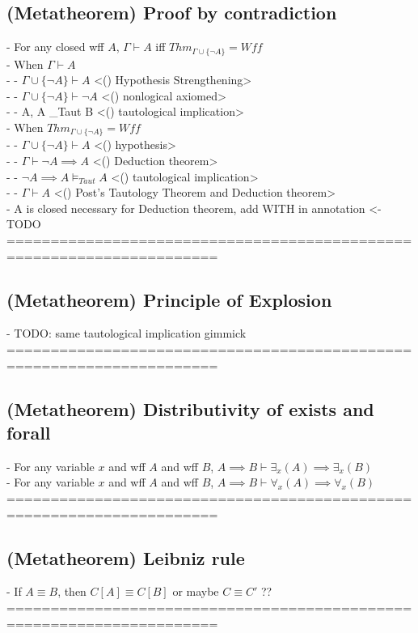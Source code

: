 \documentclass{article}
\begin{document}
\subsection{(Metatheorem) Proof by contradiction}
	- For any closed wff $A$, $\Gamma \vdash A$ iff $Thm_{\Gamma \cup \{\lnot A\}} = Wff$ \\
	- When $\Gamma \vdash A$ \\
		- - $\Gamma \cup \{\lnot A\} \vdash A$ <() Hypothesis Strengthening> \\
		- - $\Gamma \cup \{\lnot A\} \vdash \lnot A$ <() nonlogical axiomed> \\
		- - {A, \lnot A} \vDash_{Taut} B <() tautological implication> \\
	- When $Thm_{\Gamma \cup \{\lnot A\}} = Wff$ \\
		- - $\Gamma \cup \{\lnot A\} \vdash A$ <() hypothesis> \\
		- - $\Gamma \vdash \lnot A \implies A$ <() Deduction theorem> \\
		- - $\lnot A \implies A \vDash_{Taut} A$ <() tautological implication> \\
		- - $\Gamma \vdash A$ <() Post's Tautology Theorem and Deduction theorem> \\
	- A is closed necessary for Deduction theorem, add WITH in annotation <- TODO \\
	======================================================================
\subsection{(Metatheorem) Principle of Explosion}
	- TODO: same tautological implication gimmick \\
	======================================================================
\subsection{(Metatheorem) Distributivity of exists and forall}
	- For any variable $x$ and wff $A$ and wff $B$, $A \implies B \vdash \exists_x(A) \implies \exists_x(B)$ \\
	- For any variable $x$ and wff $A$ and wff $B$, $A \implies B \vdash \forall_x(A) \implies \forall_x(B)$ \\
	======================================================================
\subsection{(Metatheorem) Leibniz rule}
	- If $A \equiv B$, then $C[A] \equiv C[B]$ or maybe $C \equiv C'$ ?? \\
	======================================================================
\end{document}
